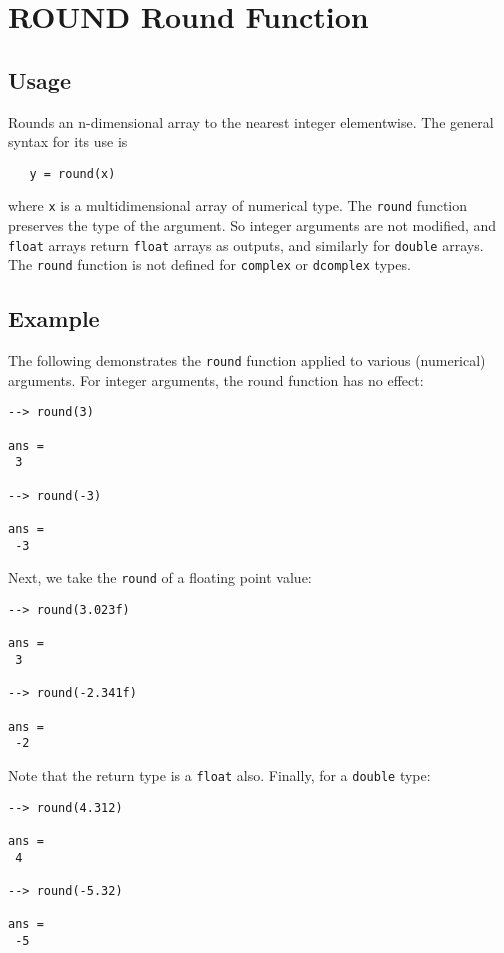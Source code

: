 \section{ROUND Round Function}

\subsection{Usage}

Rounds an n-dimensional array to the nearest integer elementwise.
The general syntax for its use is
\begin{verbatim}
   y = round(x)
\end{verbatim}
where \verb|x| is a multidimensional array of numerical type.  The \verb|round| 
function preserves the type of the argument.  So integer arguments 
are not modified, and \verb|float| arrays return \verb|float| arrays as 
outputs, and similarly for \verb|double| arrays.  The \verb|round| function 
is not defined for \verb|complex| or \verb|dcomplex| types.
\subsection{Example}

The following demonstrates the \verb|round| function applied to various
(numerical) arguments.  For integer arguments, the round function has
no effect:
\begin{verbatim}
--> round(3)

ans = 
 3 

--> round(-3)

ans = 
 -3 
\end{verbatim}
Next, we take the \verb|round| of a floating point value:
\begin{verbatim}
--> round(3.023f)

ans = 
 3 

--> round(-2.341f)

ans = 
 -2 
\end{verbatim}
Note that the return type is a \verb|float| also.  Finally, for a \verb|double|
type:
\begin{verbatim}
--> round(4.312)

ans = 
 4 

--> round(-5.32)

ans = 
 -5 
\end{verbatim}
